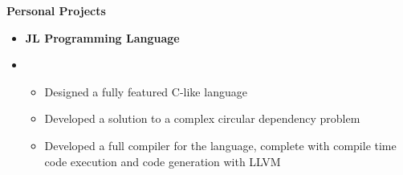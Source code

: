 \documentclass[10pt]{letter}
\begin{document}
   \noindent \textbf{\large{Personal Projects}}
   \begin{itemize}
       \item[] \textbf{JL Programming Language}
       \item[] \begin{itemize}
           \item Designed a fully featured C-like language
           \item Developed a solution to a complex circular dependency problem
           \item Developed a full compiler for the language, complete with compile time code execution and code generation with LLVM
       \end{itemize}
   \end{itemize}
\end{document}

